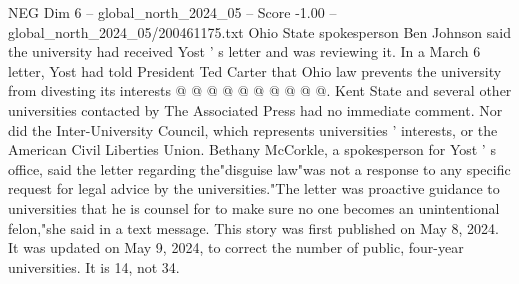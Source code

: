 \begin{textsample}{NEG Dim 6 – global\_north\_2024\_05 – Score -1.00 – global\_north\_2024\_05/200461175.txt}
Ohio State spokesperson Ben Johnson said the university had received Yost ' s letter and was reviewing it.
In a March 6 letter, Yost had told President Ted Carter that Ohio law prevents the university from divesting its interests @ @ @ @ @ @ @ @ @ @.
Kent State and several other universities contacted by The Associated Press had no immediate comment.
Nor did the Inter-University Council, which represents universities ' interests, or the American Civil Liberties Union.
Bethany McCorkle, a spokesperson for Yost ' s office, said the letter regarding the"disguise law"was not a response to any specific request for legal advice by the universities."The letter was proactive guidance to universities that he is counsel for to make sure no one becomes an unintentional felon,"she said in a text message.
This story was first published on May 8, 2024.
It was updated on May 9, 2024, to correct the number of public, four-year universities.
It is 14, not 34.

\end{textsample}
